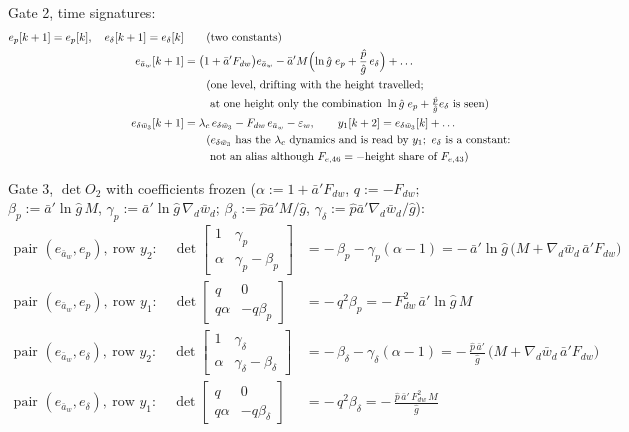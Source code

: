 \documentclass[11pt,a4paper,fontset=none]{ctexart}
\newcommand{\ba}{\bar{a}}
\newcommand{\bw}{\bar{w}}
\newcommand{\ap}{\ba'}
\newcommand{\ph}{\hat{p}}
\newcommand{\dl}{\delta}
\newcommand{\gh}{\hat{g}}
\begin{document}
Gate 2, time signatures:
\begin{align*}
e_p[k+1] = e_p[k], \quad e_{\dl}[k+1] = e_{\dl}[k] &\qquad(\text{two constants}) \\
e_{\ba_w}[k+1] &= \bigl(1 + \ap F_{dw}\bigr)e_{\ba_w} - \ap M\Bigl(\ln\gh\;e_p + \frac{\ph}{\gh}\,e_{\dl}\Bigr) + \dots \\
               &\qquad(\text{one level, drifting with the height travelled;} \\
               &\qquad\ \text{at one height only the combination } \ln\gh\;e_p + \tfrac{\ph}{\gh}e_{\dl} \text{ is seen}) \\
e_{\delta\bw_3}[k+1] &= \lambda_c\,e_{\delta\bw_3} - F_{dw}\,e_{\ba_w} - \varepsilon_w, \qquad y_1[k+2] = e_{\delta\bw_3}[k] + \dots \\
               &\qquad(e_{\delta\bw_3} \text{ has the } \lambda_c \text{ dynamics and is read by } y_1;\ e_{\dl} \text{ is a constant:} \\
               &\qquad\ \text{not an alias although } F_{e,46} = -\text{height share of } F_{e,43})
\end{align*}

Gate 3, $\det O_2$ with coefficients frozen ($\alpha := 1 + \ap F_{dw}$, $q := -F_{dw}$;
$\beta_p := \ap\ln\gh\,M$, $\gamma_p := \ap\ln\gh\,\nabla_d\bw_d$; $\beta_{\dl} := \ph\ap M/\gh$, $\gamma_{\dl} := \ph\ap\nabla_d\bw_d/\gh$):
\begin{align*}
\text{pair } (e_{\ba_w}, e_p),\ \text{row } y_2:\quad
\det\begin{bmatrix} 1 & \gamma_p \\ \alpha & \gamma_p - \beta_p \end{bmatrix} &= -\,\beta_p - \gamma_p(\alpha - 1) = -\,\ap\ln\gh\,\bigl(M + \nabla_d\bw_d\,\ap F_{dw}\bigr) \\
\text{pair } (e_{\ba_w}, e_p),\ \text{row } y_1:\quad
\det\begin{bmatrix} q & 0 \\ q\alpha & -q\beta_p \end{bmatrix} &= -\,q^{2}\beta_p = -\,F_{dw}^{2}\,\ap\ln\gh\,M \\[4pt]
\text{pair } (e_{\ba_w}, e_{\dl}),\ \text{row } y_2:\quad
\det\begin{bmatrix} 1 & \gamma_{\dl} \\ \alpha & \gamma_{\dl} - \beta_{\dl} \end{bmatrix} &= -\,\beta_{\dl} - \gamma_{\dl}(\alpha - 1) = -\,\frac{\ph\,\ap}{\gh}\,\bigl(M + \nabla_d\bw_d\,\ap F_{dw}\bigr) \\
\text{pair } (e_{\ba_w}, e_{\dl}),\ \text{row } y_1:\quad
\det\begin{bmatrix} q & 0 \\ q\alpha & -q\beta_{\dl} \end{bmatrix} &= -\,q^{2}\beta_{\dl} = -\,\frac{\ph\,\ap\,F_{dw}^{2}\,M}{\gh}
\end{align*}
\end{document}
